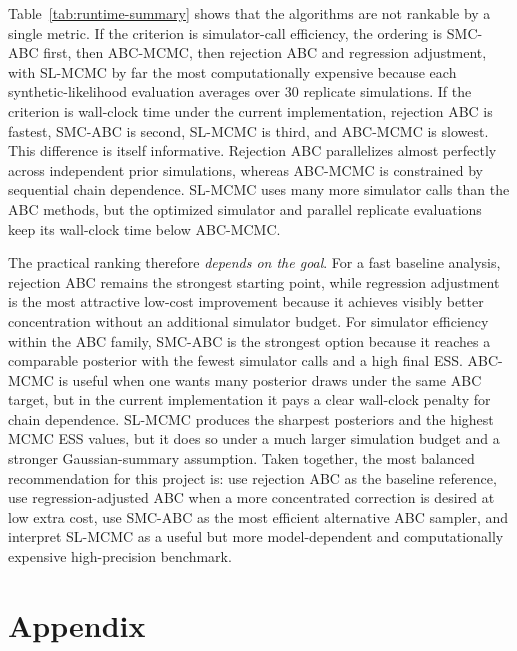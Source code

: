 \documentclass[11pt]{article}
\begin{document}
Table~\ref{tab:runtime-summary} shows that the algorithms are not rankable by a single metric. If the criterion is simulator-call efficiency, the ordering is SMC-ABC first, then ABC-MCMC, then rejection ABC and regression adjustment, with SL-MCMC by far the most computationally expensive because each synthetic-likelihood evaluation averages over $30$ replicate simulations. If the criterion is wall-clock time under the current implementation, rejection ABC is fastest, SMC-ABC is second, SL-MCMC is third, and ABC-MCMC is slowest. This difference is itself informative. Rejection ABC parallelizes almost perfectly across independent prior simulations, whereas ABC-MCMC is constrained by sequential chain dependence. SL-MCMC uses many more simulator calls than the ABC methods, but the optimized simulator and parallel replicate evaluations keep its wall-clock time below ABC-MCMC.

The practical ranking therefore \textit{depends on the goal}. For a fast baseline analysis, rejection ABC remains the strongest starting point, while regression adjustment is the most attractive low-cost improvement because it achieves visibly better concentration without an additional simulator budget. For simulator efficiency within the ABC family, SMC-ABC is the strongest option because it reaches a comparable posterior with the fewest simulator calls and a high final ESS. ABC-MCMC is useful when one wants many posterior draws under the same ABC target, but in the current implementation it pays a clear wall-clock penalty for chain dependence. SL-MCMC produces the sharpest posteriors and the highest MCMC ESS values, but it does so under a much larger simulation budget and a stronger Gaussian-summary assumption. Taken together, the most balanced recommendation for this project is: use rejection ABC as the baseline reference, use regression-adjusted ABC when a more concentrated correction is desired at low extra cost, use SMC-ABC as the most efficient alternative ABC sampler, and interpret SL-MCMC as a useful but more model-dependent and computationally expensive high-precision benchmark.

\appendix
\renewcommand{\thesection}{Appendix \Alph{section}}
\renewcommand{\thesubsection}{\Alph{section}.\arabic{subsection}}
\addcontentsline{toc}{section}{\thesection}
\section*{\thesection}
\label{app:supporting-material}
\end{document}
